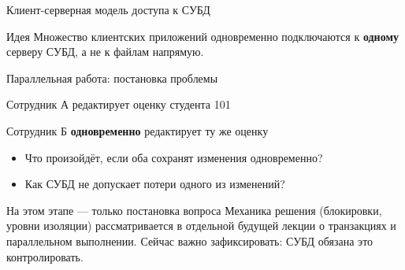 \documentclass[aspectratio=169]{beamer}
\begin{document}
\begin{frame}{Клиент-серверная модель доступа к СУБД}

\begin{center}
\end{center}

\begin{alertblock}{Идея}
Множество клиентских приложений одновременно подключаются
к \textbf{одному} серверу СУБД, а не к файлам напрямую.
\end{alertblock}

\end{frame}


\begin{frame}{Параллельная работа: постановка проблемы}

\begin{center}
\large
Сотрудник А редактирует оценку студента 101
\end{center}
\begin{center}
\large
Сотрудник Б \textbf{одновременно} редактирует ту же оценку
\end{center}

\vspace{0.4cm}

\begin{itemize}
  \item Что произойдёт, если оба сохранят изменения
        одновременно?
  \item Как СУБД не допускает потери одного из изменений?
\end{itemize}

\vspace{0.3cm}

\begin{alertblock}{На этом этапе — только постановка вопроса}
Механика решения (блокировки, уровни изоляции)
рассматривается в отдельной будущей лекции
о транзакциях и параллельном выполнении. Сейчас важно
зафиксировать: СУБД обязана это контролировать.
\end{alertblock}

\end{frame}
\end{document}
